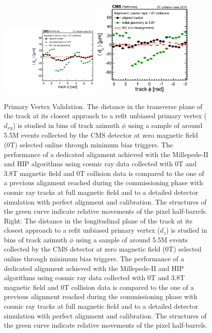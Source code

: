 \begin{figure}[htb]
    \begin{center}
        \includegraphics[width=0.45\textwidth]{../figs/Alignment/AlRes_dxyPhiBiasCanvas.pdf}\includegraphics[width=0.45\textwidth]{../figs/Alignment/AlRes_dzPhiBiasCanvas.png}
    \end{center}
    \caption{Primary Vertex Validation. The distance in the transverse plane of the track at its closest approach to a refit unbiased primary vertex ($d_{xy}$) is studied in bins of track azimuth $\phi$ using a sample of around 5.5M events collected by the CMS detector at zero magnetic field (0T) selected online through minimum bias triggers. The performance of a dedicated alignment achieved with the Millepede-II and HIP algorithms using cosmic ray data collected with 0T and 3.8T magnetic field and 0T collision data is compared to the one of a previous alignment reached during the commissioning phase with cosmic ray tracks at full magnetic field and to a detailed detector simulation with perfect alignment and calibration. The structures of the green curve indicate relative movements of the pixel half-barrels. Right: The distance in the longitudinal plane of the track at its closest approach to a refit unbiased primary vertex ($d_{z}$) is studied in bins of track azimuth $\phi$ using a sample of around 5.5M events collected by the CMS detector at zero magnetic field (0T) selected online through minimum bias triggers. The performance of a dedicated alignment achieved with the Millepede-II and HIP algorithms using cosmic ray data collected with 0T and 3.8T magnetic field and 0T collision data is compared to the one of a previous alignment reached during the commissioning phase with cosmic ray tracks at full magnetic field and to a detailed detector simulation with perfect alignment and calibration. The structures of the green curve indicate relative movements of the pixel half-barrels. }
    \label{fig:PVvalidation}
\end{figure}



